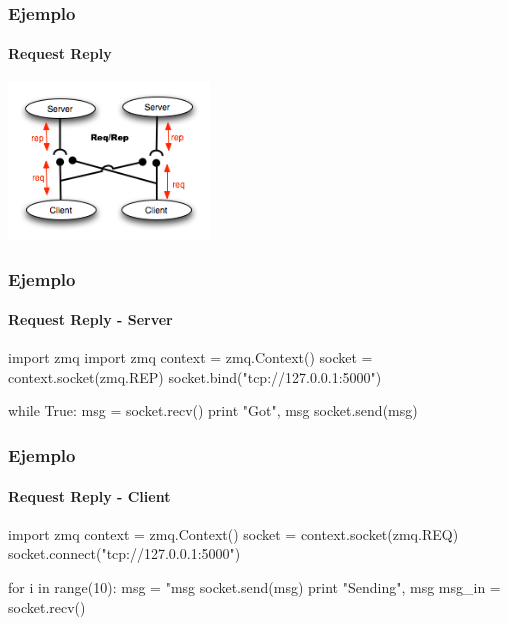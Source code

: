 \begin{frame}
    \begin{center}
        \vspace{1cm}
            \Huge {}\\
            \Large {}
    \end{center}
\end{frame}

\begin{frame}
    \frametitle{Ejemplo}
    \framesubtitle{Request Reply}
    \begin{center}
        \includegraphics[width=0.4\textwidth]{img/request-reply}
    \end{center}
\end{frame}

\begin{frame}[fragile]
    \frametitle{Ejemplo}
    \framesubtitle{Request Reply - Server}

    \begin{python}
        import zmq
        import zmq
        context = zmq.Context()
        socket = context.socket(zmq.REP)
        socket.bind("tcp://127.0.0.1:5000")
        
        while True:
            msg = socket.recv()
            print "Got", msg
            socket.send(msg)
    \end{python}

\end{frame}


\begin{frame}[fragile]
    \frametitle{Ejemplo}
    \framesubtitle{Request Reply - Client}

    \begin{python}
        import zmq
        context = zmq.Context()
        socket = context.socket(zmq.REQ)
        socket.connect("tcp://127.0.0.1:5000")
        
        for i in range(10):
            msg = "msg %
            socket.send(msg)
            print "Sending", msg
            msg_in = socket.recv()
    \end{python}

\end{frame}


